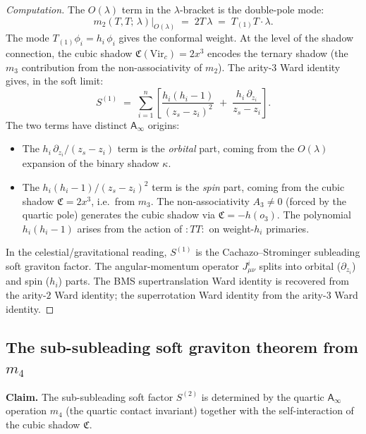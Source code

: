 \documentclass[11pt]{article}
\newcommand{\Ainf}{\mathsf{A}_{\infty}}
\begin{document}
\begin{proof}[Computation]
The $O(\lambda)$ term in the $\lambda$-bracket is the double-pole mode:
\[
m_2(T, T;\, \lambda)\big|_{O(\lambda)}
\;=\; 2T\,\lambda
\;=\; T_{(1)}T \cdot \lambda.
\]
The mode $T_{(1)}\phi_i = h_i\,\phi_i$ gives the conformal weight.  At the level of the shadow connection, the cubic shadow $\mathfrak{C}(\mathrm{Vir}_c) = 2x^3$ encodes the ternary shadow (the $m_3$ contribution from the non-associativity of $m_2$).  The arity-$3$ Ward identity gives, in the soft limit:
\begin{equation}\label{eq:cs-from-m2m3}
\boxed{
S^{(1)}
\;=\;
\sum_{i=1}^{n}
\left[
\frac{h_i(h_i - 1)}{(z_s - z_i)^2}
\;+\;
\frac{h_i\,\partial_{z_i}}{z_s - z_i}
\right].}
\end{equation}
The two terms have distinct $\Ainf$ origins:
\begin{itemize}
\item The $h_i\,\partial_{z_i}/(z_s - z_i)$ term is the \emph{orbital} part, coming from the $O(\lambda)$ expansion of the binary shadow $\kappa$.
\item The $h_i(h_i-1)/(z_s-z_i)^2$ term is the \emph{spin} part, coming from the cubic shadow $\mathfrak{C} = 2x^3$, i.e.\ from $m_3$.  The non-associativity $A_3 \ne 0$ (forced by the quartic pole) generates the cubic shadow via $\mathfrak{C} = -h(o_3)$.  The polynomial $h_i(h_i-1)$ arises from the action of $:TT:$ on weight-$h_i$ primaries.
\end{itemize}
In the celestial/gravitational reading, $S^{(1)}$ is the Cachazo--Strominger subleading soft graviton factor.  The angular-momentum operator $J^i_{\mu\nu}$ splits into orbital ($\partial_{z_i}$) and spin ($h_i$) parts.  The BMS supertranslation Ward identity is recovered from the arity-$2$ Ward identity; the superrotation Ward identity from the arity-$3$ Ward identity.
\end{proof}

\subsection{The sub-subleading soft graviton theorem from $m_4$}

\noindent\textbf{Claim.} The sub-subleading soft factor $S^{(2)}$ is determined by the quartic $\Ainf$ operation $m_4$ (the quartic contact invariant) together with the self-interaction of the cubic shadow $\mathfrak{C}$.
\end{document}
